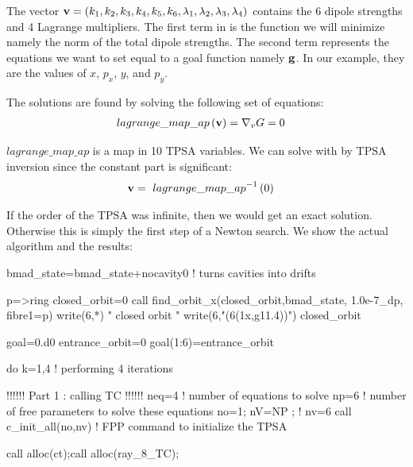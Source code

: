 \documentclass{hitec}     %
\begin{document}
{{{{{{The vector ${\bf v}=(k_1,k_2,k_3,k_4,k_5,k_6,{\lambda }_{1},{\lambda }_{2},{\lambda }_{3},{\lambda }_{4})$ contains the 6 dipole strengths and 4 Lagrange multipliers.  The first term in  is the function we will minimize namely the norm of the total dipole strengths. The second term represents the equations we want to set equal to a goal function namely $\bf g$. In our example, they are the values of $x$, $p_x$, $y$, and $p_y$.


The solutions are found by solving the   following set of equations:
%
\begin{align} lagrange\_map\_ap\left({{ \bf v }}\right)&={\nabla }_{v}G=
0 \label{eq:newt}\end{align}

$lagrange\_map\_ap$ is a map in 10 TPSA variables. We can solve with by TPSA inversion since the constant part is significant:
%
\begin{align} { \bf v }&=\ {lagrange\_map\_ap}^{-1}\left({0}\right) \label{eq:newts}\end{align}

If the order of the TPSA was infinite, then we would get an exact solution. Otherwise this is simply the first step of a Newton search. We show the actual algorithm and the results:

\begin{code}
bmad_state=bmad_state+nocavity0 ! turns cavities into drifts

p=>ring%
closed_orbit=0
call find_orbit_x(closed_orbit,bmad_state, 1.0e-7_dp, fibre1=p)
write(6,*) " closed orbit "
write(6,"(6(1x,g11.4))") closed_orbit
 
 goal=0.d0
entrance_orbit=0
goal(1:6)=entrance_orbit

do k=1,4    ! performing 4 iterations

   !!!!!! Part 1 : calling TC !!!!!!
   neq=4    ! number of equations to solve
   np=6     ! number of free parameters to solve these equations
   no=1; nV=NP ;  ! nv=6 
   call c_init_all(no,nv)   ! FPP command to initialize the TPSA
    
   call alloc(ct);call alloc(ray_8_TC);
   

\end{code}}}}}}}
\end{document}
